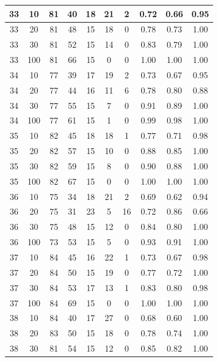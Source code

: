 \begin{longtable}{ |c|c|c|c|c|c|c|c|c|c| }
            33 & 10 & 81 & 40 & 18 & 21 & 2 & 0.72 & 0.66 & 0.95 \\ \hline
            33 & 20 & 81 & 48 & 15 & 18 & 0 & 0.78 & 0.73 & 1.00 \\ \hline
            33 & 30 & 81 & 52 & 15 & 14 & 0 & 0.83 & 0.79 & 1.00 \\ \hline
            33 & 100 & 81 & 66 & 15 & 0 & 0 & 1.00 & 1.00 & 1.00 \\ \hline
            34 & 10 & 77 & 39 & 17 & 19 & 2 & 0.73 & 0.67 & 0.95 \\ \hline
            34 & 20 & 77 & 44 & 16 & 11 & 6 & 0.78 & 0.80 & 0.88 \\ \hline
            34 & 30 & 77 & 55 & 15 & 7 & 0 & 0.91 & 0.89 & 1.00 \\ \hline
            34 & 100 & 77 & 61 & 15 & 1 & 0 & 0.99 & 0.98 & 1.00 \\ \hline
            35 & 10 & 82 & 45 & 18 & 18 & 1 & 0.77 & 0.71 & 0.98 \\ \hline
            35 & 20 & 82 & 57 & 15 & 10 & 0 & 0.88 & 0.85 & 1.00 \\ \hline
            35 & 30 & 82 & 59 & 15 & 8 & 0 & 0.90 & 0.88 & 1.00 \\ \hline
            35 & 100 & 82 & 67 & 15 & 0 & 0 & 1.00 & 1.00 & 1.00 \\ \hline
            36 & 10 & 75 & 34 & 18 & 21 & 2 & 0.69 & 0.62 & 0.94 \\ \hline
            36 & 20 & 75 & 31 & 23 & 5 & 16 & 0.72 & 0.86 & 0.66 \\ \hline
            36 & 30 & 75 & 48 & 15 & 12 & 0 & 0.84 & 0.80 & 1.00 \\ \hline
            36 & 100 & 73 & 53 & 15 & 5 & 0 & 0.93 & 0.91 & 1.00 \\ \hline
            37 & 10 & 84 & 45 & 16 & 22 & 1 & 0.73 & 0.67 & 0.98 \\ \hline
            37 & 20 & 84 & 50 & 15 & 19 & 0 & 0.77 & 0.72 & 1.00 \\ \hline
            37 & 30 & 84 & 53 & 17 & 13 & 1 & 0.83 & 0.80 & 0.98 \\ \hline
            37 & 100 & 84 & 69 & 15 & 0 & 0 & 1.00 & 1.00 & 1.00 \\ \hline
            38 & 10 & 84 & 40 & 17 & 27 & 0 & 0.68 & 0.60 & 1.00 \\ \hline
            38 & 20 & 83 & 50 & 15 & 18 & 0 & 0.78 & 0.74 & 1.00 \\ \hline
            38 & 30 & 81 & 54 & 15 & 12 & 0 & 0.85 & 0.82 & 1.00 \\ \hline

\end{longtable}
